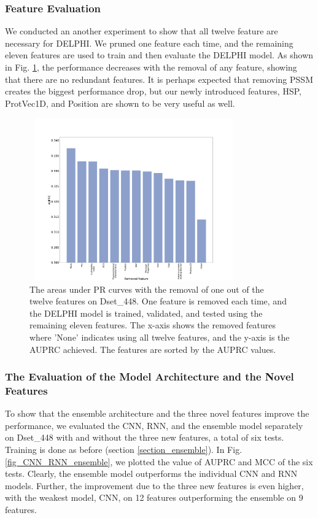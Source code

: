\subsubsection{Feature Evaluation}
We conducted an another experiment to show that all twelve feature are necessary for DELPHI. We pruned one feature each time, and the remaining eleven features are used to train and then evaluate the DELPHI model. As shown in Fig. \ref{fig_remove_each_feature}, the performance decreases with the removal of any feature, showing that there are no redundant features. It is perhaps expected that  removing PSSM creates the biggest performance drop, but our newly introduced features, HSP, ProtVec1D, and Position are shown to be  very useful as well. 
\begin{figure}[!h]
\begin{center}
\includegraphics[height = 7cm, width = 9cm]{img/remove_features_individually_Testing.pdf}
\caption[The areas under PR curves with the removal of one out of the twelve features on Dset\_448]{The areas under PR curves with the removal of one out of the twelve features on Dset\_448. One feature is removed each time, and the DELPHI model is trained, validated, and tested using the remaining eleven features. The x-axis shows the removed features where 'None' indicates using all twelve features, and the y-axis is the AUPRC achieved. The features are sorted by the AUPRC values. } \label{fig_remove_each_feature}
\end{center}
\end{figure}

\subsubsection{The Evaluation of the Model Architecture and the Novel Features\label{sec_arch_fea}}
To show that the ensemble architecture and the three novel features improve the performance, we evaluated the CNN, RNN, and the ensemble model separately on Dset\_448 with and without the three new features, a total of six tests. Training is done as before (section \ref{section_ensemble}). In Fig. \ref{fig_CNN_RNN_ensemble}, we plotted the value of AUPRC and MCC of the six tests. Clearly, the ensemble model outperforms the individual CNN and RNN models. Further, the improvement due to the three new features is even higher, with the weakest model, CNN, on 12 features outperforming the ensemble on 9 features. 

